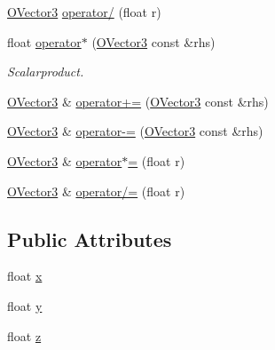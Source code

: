 \begin{DoxyCompactItemize}
\item 
\hyperlink{struct_osiris_i_1_1_o_vector3}{O\-Vector3} \hyperlink{struct_osiris_i_1_1_o_vector3_acf1c30d55279460ff520dc775dc25176}{operator/} (float r)
\item 
float \hyperlink{struct_osiris_i_1_1_o_vector3_ab7683e23923d1036a2a6c5fae61d9e5b}{operator$\ast$} (\hyperlink{struct_osiris_i_1_1_o_vector3}{O\-Vector3} const \&rhs)
\begin{DoxyCompactList}\small\item\em Scalarproduct. \end{DoxyCompactList}\item 
\hyperlink{struct_osiris_i_1_1_o_vector3}{O\-Vector3} \& \hyperlink{struct_osiris_i_1_1_o_vector3_a54ccba1af39cf085d1f586550cb2d40b}{operator+=} (\hyperlink{struct_osiris_i_1_1_o_vector3}{O\-Vector3} const \&rhs)
\item 
\hyperlink{struct_osiris_i_1_1_o_vector3}{O\-Vector3} \& \hyperlink{struct_osiris_i_1_1_o_vector3_aec07a7dc786e03d93894a9cfb9964bea}{operator-\/=} (\hyperlink{struct_osiris_i_1_1_o_vector3}{O\-Vector3} const \&rhs)
\item 
\hyperlink{struct_osiris_i_1_1_o_vector3}{O\-Vector3} \& \hyperlink{struct_osiris_i_1_1_o_vector3_adeb9066b67603f16f4f49de030d31fe4}{operator$\ast$=} (float r)
\item 
\hyperlink{struct_osiris_i_1_1_o_vector3}{O\-Vector3} \& \hyperlink{struct_osiris_i_1_1_o_vector3_a51463d307b680160362f479acfd2c942}{operator/=} (float r)
\end{DoxyCompactItemize}
\subsection*{Public Attributes}
\begin{DoxyCompactItemize}
\item 
float \hyperlink{struct_osiris_i_1_1_o_vector3_ade9127a381a17e7e24e72ea2eb213567}{x}
\item 
float \hyperlink{struct_osiris_i_1_1_o_vector3_a2973d21ed51744427fdc19ad02fec072}{y}
\item 
float \hyperlink{struct_osiris_i_1_1_o_vector3_acf11c02daf7508484ead1bd9329d30bf}{z}
\end{DoxyCompactItemize}


